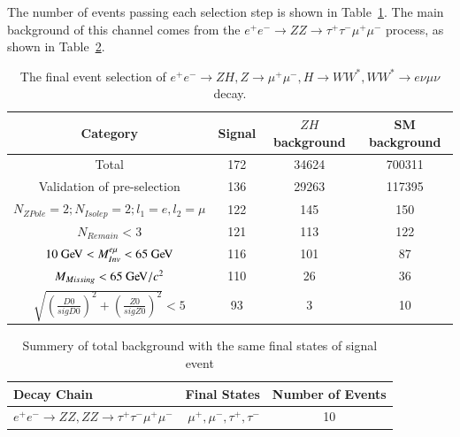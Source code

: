 \documentclass[11pt,a4paper]{cepcnote}
\begin{document}
The number of events passing each selection step is shown in Table~\ref{tab:emu}. The main background of this channel comes from
the  $e^+e^-\rightarrow  ZZ\rightarrow\tau^+\tau^-\mu^+\mu^- $ process, as shown in Table~\ref{tab:uueubkg}.
\begin{table}[H]
\begin{center}
\begin{tabular}{cccc}
\hline \hline
\multicolumn{1}{c}{Category}& \multicolumn{1}{c}{Signal}&\multicolumn{1}{c}{$ZH$ background}&\multicolumn{1}{c}{SM background}\\   
\hline
  Total                                                 &     172   & 34624 &700311\\
  Validation of pre-selection				            &     136   & 29263 & 117395\\
  $N_{ZPole}=2; N_{Isolep}=2; l_1 = e, l_2 = \mu$       &     122   &   145 &   150  \\
  $N_{Remain} < 3$                                      &     121   &   113 &   122   \\
  $10\gev < M_{Inv}^{e\mu} < 65\gev$                    &     116   &   101 &   87  \\
  $M_{Missing} < 65\gev/c^2$                      		&     110   &   26  &   36   \\
  $\sqrt{(\frac{D0}{sigD0})^2+(\frac{Z0}{sigZ0})^2} < 5$&     93    &   3   &   10   \\
  \hline \hline
  \end{tabular}
  \caption[Monte Carlo purities in the single lepton sample]{%
	  The final event selection of $e^+e^-\rightarrow ZH, Z\rightarrow\mu^+\mu^-, H\rightarrow WW^*, WW^*\rightarrow e\nu\mu\nu$ decay.}
\label{tab:emu}
\end{center}
\end{table}
\begin{table}[H]
\begin{center}
\begin{tabular}{lrc}
\hline\hline
Decay Chain	& Final States 	&	Number of Events\\
\hline
$e^+e^-\rightarrow ZZ, ZZ\rightarrow\tau^+\tau^-\mu^+\mu^- $	& $\mu^+, \mu^-, \tau^+, \tau^-$			&10	\\
\hline\hline
\end{tabular}
\caption{Summery of total background with the same final states of signal event}
\label{tab:uueubkg}
\end{center}
\end{table}
\end{document}
